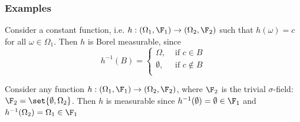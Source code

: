 \documentclass{article} %
\begin{document}
\subsubsection{Examples}

\begin{example}{}
Consider a constant function, i.e. $h: (\Omega_1, \F_1) \to (\Omega_2, \F_2)$ such that $h(\omega) =   c$ for all $\omega \in \Omega_1$.  Then $h$ is Borel measurable, since 
\[ h^{-1}(B) = 
\begin{cases}
\Omega, & \text{ if } c \in B\\ 
\emptyset, & \text{ if } c \not\in B\\ 
\end{cases}
\]
\label{ex:constant_functions_are_borel_measurable}
\end{example}

\begin{example}{}
Consider any function $h : (\Omega_1, \F_1) \to (\Omega_2, \F_2)$, where $\F_2$ is the trivial $\sigma$-field: $\F_2 = \set{\emptyset, \Omega_2}$.  Then $h$ is measurable since $h^{-1}(\emptyset) = \emptyset \in \F_1$ and  $h^{-1}(\Omega_2) = \Omega_1 \in \F_1$
\label{ex:any_function_is_measurable_with_respect_to_trivial_sigma_field}	
\end{example}
\end{document}

